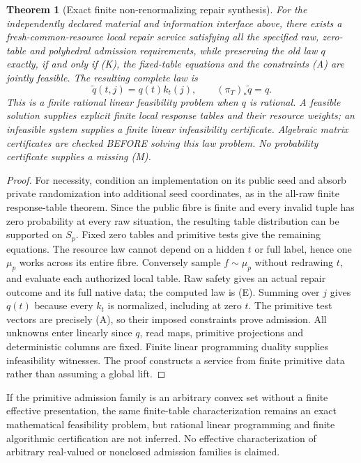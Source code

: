 \documentclass[11pt]{article}
\newtheorem{theorem}{Theorem}\newtheorem{proposition}{Proposition}
\begin{document}
\begin{theorem}[Exact finite non-renormalizing repair synthesis]\label{thm:repair}
For the independently declared material and information interface above, there exists a fresh-common-resource local repair service satisfying all the specified raw, zero-table and polyhedral admission requirements, while preserving the old law $q$ exactly, if and only if (K), the fixed-table equations and the constraints (A) are jointly feasible. The resulting complete law is
\[
 \widetilde q(t,j)=q(t)k_t(j),\qquad
 (\pi_T)_*\widetilde q=q.\tag{E}
\]
This is a finite rational linear feasibility problem when $q$ is rational. A feasible solution supplies explicit finite local response tables and their resource weights; an infeasible system supplies a finite linear infeasibility certificate. Algebraic matrix certificates are checked BEFORE solving this law problem. No probability certificate supplies a missing (M).
\end{theorem}
\begin{proof}
For necessity, condition an implementation on its public seed and absorb private randomization into additional seed coordinates, as in the all-raw finite response-table theorem. Since the public fibre is finite and every invalid tuple has zero probability at every raw situation, the resulting table distribution can be supported on $S_p$. Fixed zero tables and primitive tests give the remaining equations. The resource law cannot depend on a hidden $t$ or full label, hence one $\mu_p$ works across its entire fibre. Conversely sample $f\sim\mu_p$ without redrawing $t$, and evaluate each authorized local table. Raw safety gives an actual repair outcome and its full native data; the computed law is (E). Summing over $j$ gives $q(t)$ because every $k_t$ is normalized, including at zero $t$. The primitive test vectors are precisely (A), so their imposed constraints prove admission. All unknowns enter linearly since $q$, read maps, primitive projections and deterministic columns are fixed. Finite linear programming duality supplies infeasibility witnesses. The proof constructs a service from finite primitive data rather than assuming a global lift.
\end{proof}

If the primitive admission family is an arbitrary convex set without a finite effective presentation, the same finite-table characterization remains an exact mathematical feasibility problem, but rational linear programming and finite algorithmic certification are not inferred. No effective characterization of arbitrary real-valued or nonclosed admission families is claimed.
\end{document}
